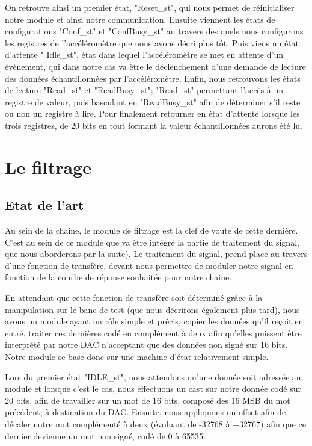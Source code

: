 \documentclass[french,a4paper,12pt]{report}
\begin{document}
			On retrouve ainsi un premier état, "Reset\_st", qui nous permet de réinitialiser notre module et ainsi notre communication. Ensuite viennent les états de configurations "Conf\_st" et "ConfBusy\_st" au travers des quels nous configurons les registres de l'accéléromètre que nous avons décri plus tôt. Puis viens un état d'attente " Idle\_st", état dans lequel l'accéléromètre se met en attente d'un évènement, qui dans notre cas va être le déclenchement d'une demande de lecture des données échantillonnées par l'accéléromètre. Enfin, nous retrouvons les états de lecture "Read\_st" et "ReadBusy\_st"; "Read\_st" permettant l'accès à un registre de valeur, puis basculant en "ReadBusy\_st" afin de déterminer s'il reste ou non un registre à lire. Pour finalement retourner en état d'attente lorsque les trois registres, de 20 bits en tout formant la valeur échantillonnées aurons été lu.		
	
	\chapter{Le filtrage}
	
	\section{Etat de l'art}
	Au sein de la chaine, le module de filtrage est la clef de voute de cette dernière. C'est au sein de ce module que va être intégré la partie de traitement du signal, que nous aborderons par la suite). Le traitement du signal, prend place au travers d'une fonction de transfère, devant nous permettre de moduler notre signal en fonction de la courbe de réponse souhaitée pour notre chaine.
	
	En attendant que cette fonction de transfère soit déterminé grâce à la manipulation sur le banc de test (que nous décrirons également plus tard), nous avons un module ayant un rôle simple et précis, copier les données qu'il reçoit en entré, traiter ces dernières codé en complément à deux afin qu'elles puissent être interprété par notre DAC n'acceptant que des données non signé sur 16 bits. Notre module se base donc sur une machine d'état relativement simple.
	
	Lors du premier état "IDLE\_st", nous attendons qu'une donnée soit adressée au module et lorsque c'est le cas, nous effectuons un cast sur notre donnée codé sur 20 bits, afin de travailler sur un mot de 16 bits, composé des 16 MSB du mot précédent, à destination du DAC. Ensuite, nous appliquons un offset afin de décaler notre mot complémenté à deux (évoluant de -32768 à +32767) afin que ce dernier devienne un mot non signé, codé de 0 à 65535.
	
\end{document}
